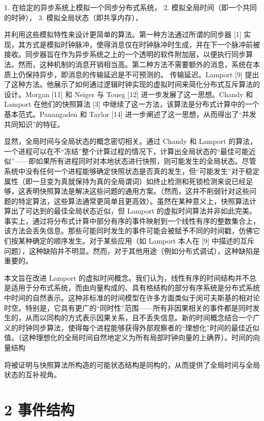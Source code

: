 \documentclass[12pt,a4paper]{report} %
\begin{document}
1. 在给定的异步系统上模拟一个同步分布式系统，  
2. 模拟全局时间（即一个共同的时钟），  
3. 模拟全局状态（即共享内存），  

并利用这些模拟特性来设计更简单的算法。第一种方法通过所谓的同步器 [1] 实现，其方式是模拟时钟脉冲，使得消息仅在时钟脉冲时生成，并在下一个脉冲前被接收。同步器旨在作为异步系统之上的一个透明的软件附加层，以便执行同步算法。然而，这种机制的消息开销相当高。第二种方法不需要额外的消息，系统在本质上仍保持异步，即消息的传输延迟是不可预测的。
传输延迟。Lamport [9] 提出了这种方法。他展示了如何通过逻辑时钟实现的虚拟时间来简化分布式互斥算法的设计。Morgan [11] 和 Neiger 与 Toueg [12] 进一步发展了这一思想。Chandy 和 Lamport 在他们的快照算法 [3] 中继续了这一方法，该算法是分布式计算中的一个基本范式。Panangaden 和 Taylor [14] 进一步阐述了这一思想，从而得出了“并发共同知识”的特征。

显然，全局时间与全局状态的概念密切相关。通过 Chandy 和 Lamport 的算法，一个进程可以在不“冻结”整个计算过程的情况下，计算出全局状态的“最佳可能近似”——即如果所有进程同时对本地状态进行快照，则可能发生的全局状态。尽管系统中没有任何一个进程能够确定快照状态是否真的发生，但“可能发生”对于稳定属性（即一旦变为真就保持为真的全局谓词）如终止检测和死锁检测来说已经足够，这表明快照算法是解决这些问题的通用方案。（然而，这并不削弱针对这些问题的特定算法，这些算法通常更简单且更高效）。虽然在某种意义上，快照算法计算出了可达到的最佳全局状态近似，但 Lamport 的虚拟时间算法并非如此完美。事实上，通过将分布式计算中部分有序的事件映射到一个线性有序的整数集合上，该方法会丢失信息。那些可能同时发生的事件可能会被赋予不同的时间戳，仿佛它们按某种确定的顺序发生。对于某些应用（如 Lamport 本人在 [9] 中描述的互斥问题），这种缺陷并不明显。然而，对于其他用途（例如分布式调试），这种缺陷是重要的。

本文旨在改进 Lamport 的虚拟时间概念。我们认为，线性有序的时间结构并不总是适用于分布式系统，而由向量构成的、具有格结构的部分有序系统是分布式系统中时间的自然表示。这种非标准的时间模型在许多方面类似于闵可夫斯基的相对论时空。特别是，它具有更广的“同时性”范围——所有非因果相关的事件都是同时发生的，从而以同构的方式表示因果关系，且不丢失信息。新的时间概念结合一个广义的时钟同步算法，使得每个进程能够获得外部观察者的“理想化”时间的最佳近似值。（这种理想化的全局时间自然地定义为所有局部时钟向量的上确界）。时间的向量结构

将被证明与快照算法所构造的可能状态结构是同构的，从而提供了全局时间与全局状态的互补视角。

\section*{2 事件结构}
\end{document}
